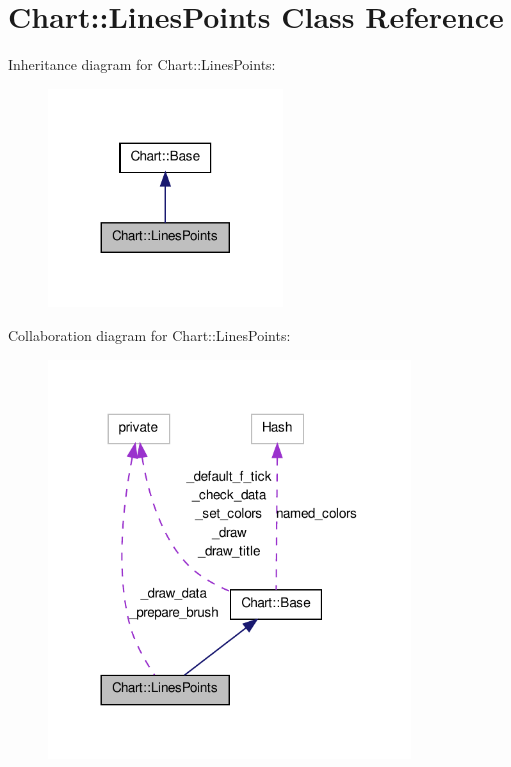 \hypertarget{classChart_1_1LinesPoints}{
\section{Chart::LinesPoints Class Reference}
\label{classChart_1_1LinesPoints}
}


Inheritance diagram for Chart::LinesPoints:\nopagebreak
\begin{figure}[H]
\begin{center}
\leavevmode
\includegraphics[width=176pt]{classChart_1_1LinesPoints__inherit__graph}
\end{center}
\end{figure}


Collaboration diagram for Chart::LinesPoints:\nopagebreak
\begin{figure}[H]
\begin{center}
\leavevmode
\includegraphics[width=272pt]{classChart_1_1LinesPoints__coll__graph}
\end{center}
\end{figure}
